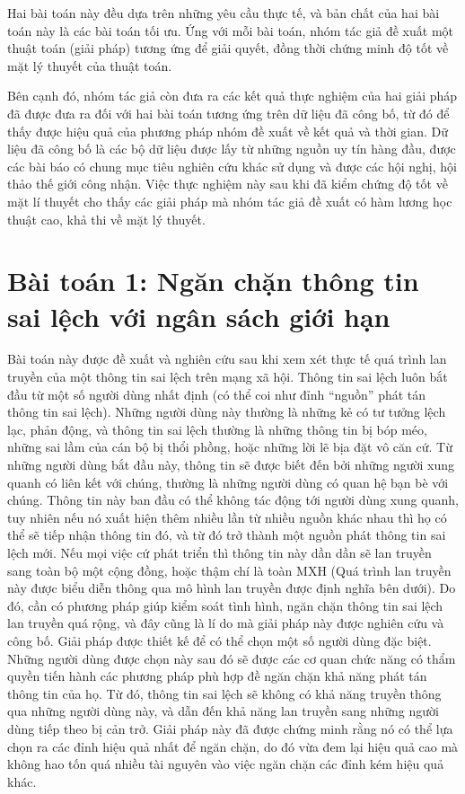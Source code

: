 Hai bài toán này đều dựa trên những yêu cầu thực tế, và bản chất của hai bài toán này là các bài toán tối ưu. Ứng với mỗi bài toán, nhóm tác giả đề xuất một thuật toán (giải pháp) tương ứng để giải quyết, đồng thời chứng minh độ tốt về mặt lý thuyết của thuật toán.

Bên cạnh đó, nhóm tác giả còn đưa ra các kết quả thực nghiệm của hai giải pháp đã được đưa ra đối với hai bài toán tương ứng trên dữ liệu đã công bố, từ đó để thấy được hiệu quả của phương pháp nhóm đề xuất về kết quả và thời gian. Dữ liệu đã công bố là các bộ dữ liệu được lấy từ những nguồn uy tín hàng đầu, được các bài báo có chung mục tiêu nghiên cứu khác sử dụng và được các hội nghị, hội thảo thế giới công nhận. Việc thực nghiệm này sau khi đã kiểm chứng độ tốt về mặt lí thuyết cho thấy các giải pháp mà nhóm tác giả đề xuất có hàm lương học thuật cao, khả thi về mặt lý thuyết.

\section{Bài toán 1: Ngăn chặn thông tin sai lệch với ngân sách giới hạn}
Bài toán này được đề xuất và nghiên cứu sau khi xem xét thực tế quá trình lan truyền của một thông tin sai lệch trên mạng xã hội. Thông tin sai lệch luôn bắt đầu từ một số người dùng nhất định (có thể coi như đỉnh “nguồn” phát tán thông tin sai lệch). Những người dùng này thường là những kẻ có tư tưởng lệch lạc, phản động, và thông tin sai lệch thường là những thông tin bị bóp méo, những sai lầm của cán bộ bị thổi phồng, hoặc những lời lẽ bịa đặt vô căn cứ. Từ những người dùng bắt đầu này, thông tin sẽ được biết đến bởi những người xung quanh có liên kết với chúng, thường là những người dùng có quan hệ bạn bè với chúng. Thông tin này ban đầu có thể không tác động tới người dùng xung quanh, tuy nhiên nếu nó xuất hiện thêm nhiều lần từ nhiều nguồn khác nhau thì họ có thể sẽ tiếp nhận thông tin đó, và từ đó trở thành một nguồn phát thông tin sai lệch mới. Nếu mọi việc cứ phát triển thì thông tin này dần dần sẽ lan truyền sang toàn bộ một cộng đồng, hoặc thậm chí là toàn MXH (Quá trình lan truyền này được biểu diễn thông qua mô hình lan truyền được định nghĩa bên dưới). Do đó, cần có phương pháp giúp kiểm soát tình hình, ngăn chặn thông tin sai lệch lan truyền quá rộng, và đây cũng là lí do mà giải pháp này được nghiên cứu và công bố. Giải pháp được thiết kế để có thể chọn một số người dùng đặc biệt. Những người dùng được chọn này sau đó sẽ được các cơ quan chức năng có thẩm quyền tiến hành các phương pháp phù hợp đề ngăn chặn khả năng phát tán thông tin của họ. Từ đó, thông tin sai lệch sẽ không có khả năng truyền thông qua những người dùng này, và dẫn đến khả năng lan truyền sang những người dùng tiếp theo bị cản trở. Giải pháp này đã được chứng minh rằng nó có thể lựa chọn ra các đỉnh hiệu quả nhất để ngăn chặn, do đó vừa đem lại hiệu quả cao mà không hao tốn quá nhiều tài nguyên vào việc ngăn chặn các đỉnh kém hiệu quả khác.
